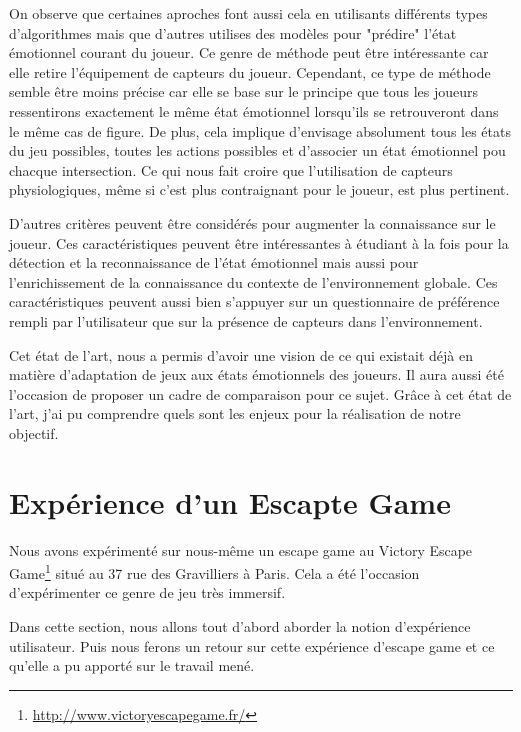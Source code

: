 \documentclass{article}
\begin{document}
	On observe que certaines aproches font aussi cela en utilisants différents types d'algorithmes mais que d'autres utilises des modèles pour "prédire" l'état émotionnel courant du joueur.
	Ce genre de méthode peut être intéressante car elle retire l'équipement de capteurs du joueur.
	Cependant, ce type de méthode semble être moins précise car elle se base sur le principe que tous les joueurs ressentirons exactement le même état émotionnel lorsqu'ils se retrouveront dans le même cas de figure.
	De plus, cela implique d'envisage absolument tous les états du jeu possibles, toutes les actions possibles et d'associer un état émotionnel pou chacque intersection.
	Ce qui nous fait croire que l'utilisation de capteurs physiologiques, même si c'est plus contraignant pour le joueur, est plus pertinent.\par
	D'autres critères peuvent être considérés pour augmenter la connaissance sur le joueur.
	Ces caractéristiques peuvent être intéressantes à étudiant à la fois pour la détection et la reconnaissance de l'état émotionnel mais aussi pour l'enrichissement de la connaissance du contexte de l'environnement globale. 
	Ces caractéristiques peuvent aussi bien s'appuyer sur un questionnaire de préférence rempli par l'utilisateur que sur la présence de capteurs dans l'environnement.\par
	Cet état de l'art, nous a permis d'avoir une vision de ce qui existait déjà en matière d'adaptation de jeux aux états émotionnels des joueurs.
	Il aura aussi été l'occasion de proposer un cadre de comparaison pour ce sujet.
	Grâce à cet état de l'art, j'ai pu comprendre quels sont les enjeux pour la réalisation de notre objectif.

\section{Expérience d'un Escapte Game}
	Nous avons expérimenté sur nous-même un escape game au Victory Escape Game\footnote{\href{http://www.victoryescapegame.fr/}{http://www.victoryescapegame.fr/}} situé au 37 rue des Gravilliers à Paris.
	Cela a été l'occasion d'expérimenter ce genre de jeu très immersif.\par
	Dans cette section, nous allons tout d'abord aborder la notion d'expérience utilisateur.
	Puis nous ferons un retour sur cette expérience d'escape game et ce qu'elle a pu apporté sur le travail mené.
\end{document}
